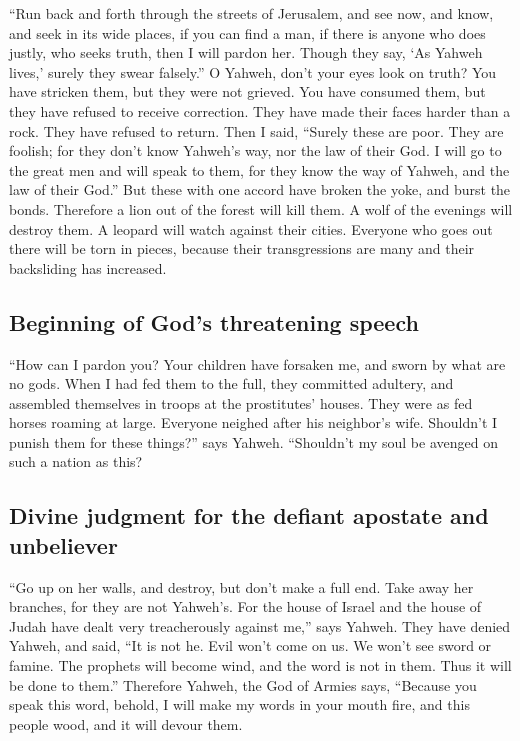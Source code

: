  ``Run back and forth through the streets of Jerusalem,
and see now, and know, and seek in its wide places, if you can find a
man, if there is anyone who does justly, who seeks truth, then I will
pardon her.  Though they say, `As Yahweh lives,' surely
they swear falsely.''  O Yahweh, don't your eyes look on
truth? You have stricken them, but they were not grieved. You have
consumed them, but they have refused to receive correction. They have
made their faces harder than a rock. They have refused to return.
 Then I said, ``Surely these are poor. They are foolish;
for they don't know Yahweh's way, nor the law of their God.
 I will go to the great men and will speak to them, for
they know the way of Yahweh, and the law of their God.'' But these with
one accord have broken the yoke, and burst the bonds. 
Therefore a lion out of the forest will kill them. A wolf of the
evenings will destroy them. A leopard will watch against their cities.
Everyone who goes out there will be torn in pieces, because their
transgressions are many and their backsliding has increased.

\hypertarget{beginning-of-gods-threatening-speech}{%
\subsection{Beginning of God's threatening
speech}\label{beginning-of-gods-threatening-speech}}

 ``How can I pardon you? Your children have forsaken me,
and sworn by what are no gods. When I had fed them to the full, they
committed adultery, and assembled themselves in troops at the
prostitutes' houses.  They were as fed horses roaming at
large. Everyone neighed after his neighbor's wife. 
Shouldn't I punish them for these things?'' says Yahweh. ``Shouldn't my
soul be avenged on such a nation as this?

\hypertarget{divine-judgment-for-the-defiant-apostate-and-unbeliever}{%
\subsection{Divine judgment for the defiant apostate and
unbeliever}\label{divine-judgment-for-the-defiant-apostate-and-unbeliever}}

 ``Go up on her walls, and destroy, but don't make a full
end. Take away her branches, for they are not Yahweh's. 
For the house of Israel and the house of Judah have dealt very
treacherously against me,'' says Yahweh.  They have
denied Yahweh, and said, ``It is not he. Evil won't come on us. We won't
see sword or famine.  The prophets will become wind, and
the word is not in them. Thus it will be done to them.'' 
Therefore Yahweh, the God of Armies says, ``Because you speak this word,
behold, I will make my words in your mouth fire, and this people wood,
and it will devour them.

